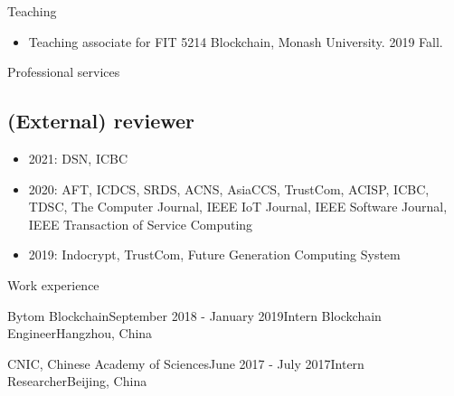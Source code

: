 \documentclass{resume} %
\begin{document}
\begin{rSection}{Teaching}
    \begin{itemize}
        \item Teaching associate for FIT 5214 Blockchain, Monash University. 2019 Fall.
    \end{itemize}
\end{rSection}


\begin{rSection}{Professional services}
    \subsection*{(External) reviewer}
    \begin{itemize}
        \item 2021: DSN, ICBC
        \item 2020: AFT, ICDCS, SRDS, ACNS, AsiaCCS, TrustCom, ACISP, ICBC, TDSC, The Computer Journal, IEEE IoT Journal, IEEE Software Journal, IEEE Transaction of Service Computing
        \item 2019: Indocrypt, TrustCom, Future Generation Computing System
    \end{itemize}
\end{rSection}

\begin{rSection}{Work experience}

    \begin{rSubsubsection}{Bytom Blockchain}{September 2018 - January 2019}{Intern Blockchain Engineer}{Hangzhou, China}
    \end{rSubsubsection}

    \begin{rSubsubsection}{CNIC, Chinese Academy of Sciences}{June 2017 - July 2017}{Intern Researcher}{Beijing, China}
    \end{rSubsubsection}

\end{rSection}
\end{document}
